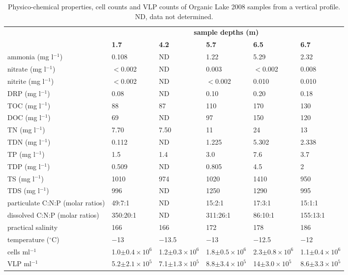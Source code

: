 \begin{table}
\footnotesize
\caption[Physico-chemical properties of Organic Lake 2008 vertical profile]{Physico-chemical properties, cell counts and \ac{VLP} counts of Organic Lake 2008 samples from a vertical profile. ND, data not determined.}
\label{tab:physico-chem}
\smallskip
\begin{tabularx}{\textwidth}{p{2.6cm}XXXXX}
\toprule
 & \multicolumn{5}{c}{\textbf{sample depths (m)}}\\
 & \textbf{1.7} & \textbf{4.2} & \textbf{5.7} & \textbf{6.5} & \textbf{6.7}\\
\midrule
ammonia (mg l$^{-1}$) & 0.108 & ND & 1.22 & 5.29 & 2.32 \\
nitrate (mg l$^{-1}$) & $<$0.002 & ND & 0.003 & $<$0.002 & 0.008 \\
nitrite (mg l$^{-1}$) & $<$0.002 & ND & $<$0.002 & 0.010 & 0.010 \\
\ac{DRP} (mg l$^{-1}$) & 0.08 & ND & 0.10 & 0.20 & 0.18 \\
\ac{TOC} (mg l$^{-1}$) & 88 & 87 & 110 & 170 & 130 \\
\ac{DOC} (mg l$^{-1}$) & 69 & ND & 97 & 150 & 120 \\
\ac{TN} (mg l$^{-1}$) & 7.70 & 7.50 & 11 & 24 & 13 \\
\ac{TDN} (mg l$^{-1}$) & 0.112 & ND & 1.225 & 5.302 & 2.338 \\
\ac{TP} (mg l$^{-1}$) & 1.5 & 1.4 & 3.0 & 7.6 & 3.7 \\
\ac{TDP} (mg l$^{-1}$) & 0.509 & ND & 0.805 & 4.5 & 2 \\
\ac{TS} (mg l$^{-1}$) & 1010 & 974 & 1020 & 1410 & 950 \\
\ac{TDS} (mg l$^{-1}$) & 996 & ND & 1250 & 1290 & 995 \\
particulate C:N:P (molar ratios) & 49:7:1 & ND & 15:2:1 & 17:3:1 & 15:1:1 \\
dissolved C:N:P (molar ratios) & 350:20:1 & ND & 311:26:1 & 86:10:1 & 155:13:1 \\
practical salinity & 166 & 166 & 172 & 178 & 186 \\
temperature ($^{\circ}$C) & $-$13 & $-$13.5 & $-$13 & $-$12.5 & $-$12 \\
cells ml$^{-1}$ & 1.0$\pm0.4 \times 10^6$ & 1.2$\pm0.3 \times 10^6$ & 1.8$\pm0.5 \times 10^6$ & 2.3$\pm0.8 \times 10^6$ & 1.1$\pm0.4 \times 10^6$ \\
\ac{VLP} ml$^{-1}$ & 5.2$\pm2.1 \times 10^5$ & 7.1$\pm1.3 \times 10^5$ & 8.8$\pm3.4 \times 10^5$ & 14$\pm3.0 \times 10^5$ & 8.6$\pm3.3 \times 10^5$ \\
\bottomrule
\end{tabularx}
\end{table}
